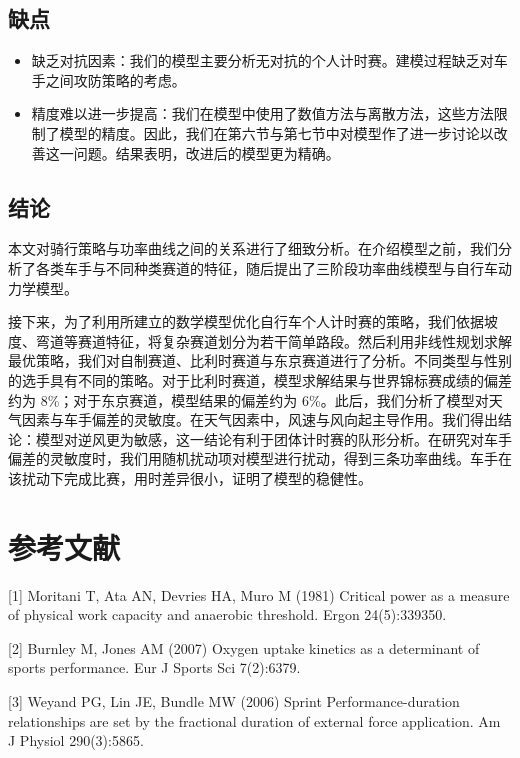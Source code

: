 \documentclass[11pt,a4paper]{ctexart}
\begin{document}
\subsection{缺点}

\begin{itemize}
\item 缺乏对抗因素：我们的模型主要分析无对抗的个人计时赛。建模过程缺乏对车手之间攻防策略的考虑。
\item 精度难以进一步提高：我们在模型中使用了数值方法与离散方法，这些方法限制了模型的精度。因此，我们在第六节与第七节中对模型作了进一步讨论以改善这一问题。结果表明，改进后的模型更为精确。
\end{itemize}

\subsection{结论}

本文对骑行策略与功率曲线之间的关系进行了细致分析。在介绍模型之前，我们分析了各类车手与不同种类赛道的特征，随后提出了三阶段功率曲线模型与自行车动力学模型。

接下来，为了利用所建立的数学模型优化自行车个人计时赛的策略，我们依据坡度、弯道等赛道特征，将复杂赛道划分为若干简单路段。然后利用非线性规划求解最优策略，我们对自制赛道、比利时赛道与东京赛道进行了分析。不同类型与性别的选手具有不同的策略。对于比利时赛道，模型求解结果与世界锦标赛成绩的偏差约为 8\%；对于东京赛道，模型结果的偏差约为 6\%。此后，我们分析了模型对天气因素与车手偏差的灵敏度。在天气因素中，风速与风向起主导作用。我们得出结论：模型对逆风更为敏感，这一结论有利于团体计时赛的队形分析。在研究对车手偏差的灵敏度时，我们用随机扰动项对模型进行扰动，得到三条功率曲线。车手在该扰动下完成比赛，用时差异很小，证明了模型的稳健性。

\section*{参考文献}

[1] Moritani T, Ata AN, Devries HA, Muro M (1981) Critical power as a measure of physical work capacity and anaerobic threshold. Ergon 24(5):339350.

[2] Burnley M, Jones AM (2007) Oxygen uptake kinetics as a determinant of sports performance. Eur J Sports Sci 7(2):6379.

[3] Weyand PG, Lin JE, Bundle MW (2006) Sprint Performance-duration relationships are set by the fractional duration of external force application. Am J Physiol 290(3):5865.
\end{document}
